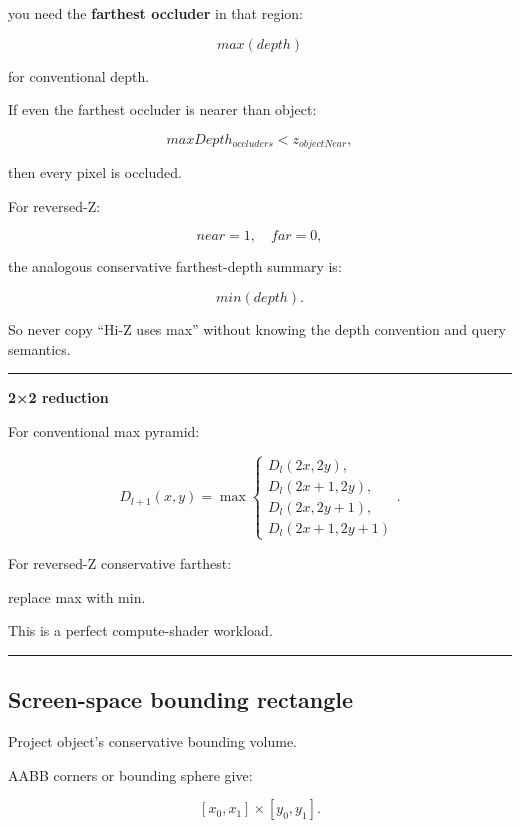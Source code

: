 you need the \textbf{farthest occluder} in that region:

\[
\boxed{
max(depth)
}
\]

for conventional depth.

If even the farthest occluder is nearer than object:

\[
maxDepth_{occluders}
<
z_{objectNear},
\]

then every pixel is occluded.

For reversed-Z:

\[
near=1,\quad far=0,
\]

the analogous conservative farthest-depth summary is:

\[
\boxed{
min(depth).
}
\]

So never copy ``Hi-Z uses max'' without knowing the depth convention and query semantics.

\begin{center}\rule{0.5\linewidth}{0.5pt}\end{center}

\textbf{2×2 reduction}

For conventional max pyramid:

\[
D_{l+1}(x,y)
=
\max
\begin{cases}
D_l(2x,2y),\\
D_l(2x+1,2y),\\
D_l(2x,2y+1),\\
D_l(2x+1,2y+1)
\end{cases}.
\]

For reversed-Z conservative farthest:

replace max with min.

This is a perfect compute-shader workload.

\begin{center}\rule{0.5\linewidth}{0.5pt}\end{center}

\subsection{Screen-space bounding rectangle}\label{04-visual-computing-ii-ch040-screen-space-bounding-rectangle}

\hypertarget{04-visual-computing-ii-ch040-screen-space-bounding-rectangle}{}

Project object's conservative bounding volume.

AABB corners or bounding sphere give:

\[
[x_0,x_1]
\times
[y_0,y_1].
\]

